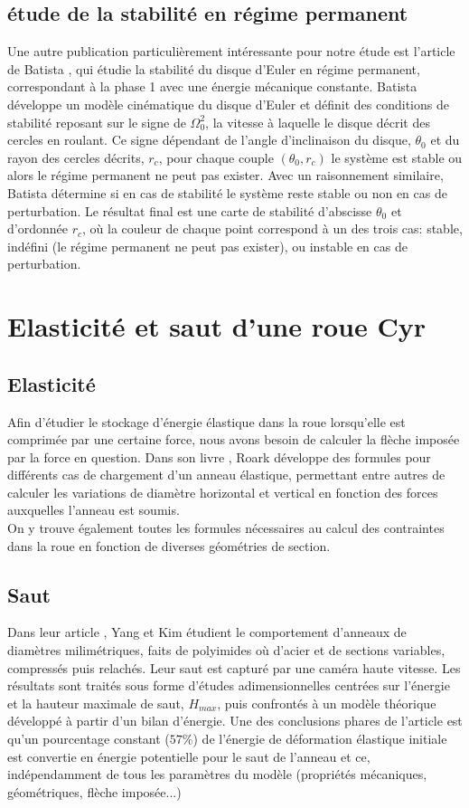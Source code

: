 \subsection{étude de la stabilité en régime permanent}
Une autre publication particulièrement intéressante pour notre étude est l'article de Batista \cite{Batista}, qui étudie la stabilité du disque d'Euler en régime permanent, correspondant à la phase 1 avec une énergie mécanique constante. Batista développe un modèle cinématique du disque d'Euler et définit des conditions de stabilité reposant sur le signe de $\Omega_0^2$, la vitesse à laquelle le disque décrit des cercles en roulant. Ce signe dépendant de l'angle d'inclinaison du disque, $\theta_0$ et du rayon des cercles décrits, $r_c$, pour chaque couple $(\theta_0,r_c)$ le système est stable ou alors le régime permanent ne peut pas exister. Avec un raisonnement similaire, Batista détermine si en cas de stabilité le système reste stable ou non en cas de perturbation. Le résultat final est une carte de stabilité d'abscisse $\theta_0$ et d'ordonnée $r_c$, où la couleur de chaque point correspond à un des trois cas: stable, indéfini (le régime permanent ne peut pas exister), ou instable en cas de perturbation.

\section{Elasticité et saut d'une roue Cyr}
\subsection{Elasticité}
Afin d’étudier le stockage d’énergie élastique dans la roue lorsqu’elle est comprimée par une certaine force, nous avons besoin de calculer la flèche imposée par la force en question. Dans son livre \cite{roark}, Roark développe des formules pour différents cas de chargement d’un anneau élastique, permettant entre autres de calculer les variations de diamètre horizontal et vertical en fonction des forces auxquelles l’anneau est soumis. \\
On y trouve également toutes les formules nécessaires au calcul des contraintes dans la roue en fonction de diverses géométries de section.

\subsection{Saut}
Dans leur article \cite{yangkim}, Yang et Kim étudient le comportement d'anneaux de diamètres milimétriques, faits de polyimides où d'acier et de sections variables, compressés puis relachés. Leur saut est capturé par une caméra haute vitesse. Les résultats sont traités sous forme d'études adimensionnelles centrées sur l'énergie et la hauteur maximale de saut, $H_{max}$, puis confrontés à un modèle théorique développé à partir d'un bilan d'énergie. Une des conclusions phares de l'article est qu'un pourcentage constant ($57\%$) de l'énergie de déformation élastique initiale est convertie en énergie potentielle pour le saut de l'anneau et ce, indépendamment de tous les paramètres du modèle (propriétés mécaniques, géométriques, flèche imposée...)